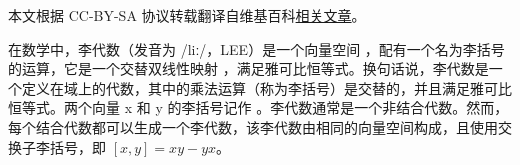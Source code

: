 
本文根据 CC-BY-SA 协议转载翻译自维基百科\href{https://en.wikipedia.org/wiki/Lie_algebra}{相关文章}。

在数学中，李代数（发音为 /liː/，LEE）是一个向量空间 {}，配有一个名为李括号的运算，它是一个交替双线性映射 {}，满足雅可比恒等式。换句话说，李代数是一个定义在域上的代数，其中的乘法运算（称为李括号）是交替的，并且满足雅可比恒等式。两个向量 {\displaystyle x} 和 {\displaystyle y} 的李括号记作 {\displaystyle [x,y]}。李代数通常是一个非结合代数。然而，每个结合代数都可以生成一个李代数，该李代数由相同的向量空间构成，且使用交换子李括号，即 \([x,y]=xy-yx\)。